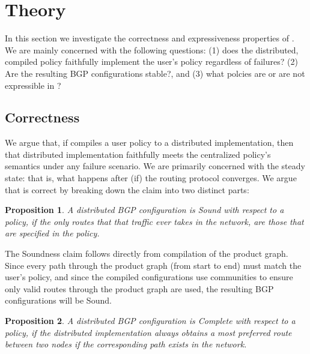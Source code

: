 \section{Theory}

\newtheorem{defn}{Proposition}[section]

In this section we investigate the correctness and expressiveness properties of \sysname. We are mainly concerned with the following questions: (1) does the distributed, compiled policy faithfully implement the user's policy regardless of failures? (2) Are the resulting BGP configurations stable?, and (3) what polcies are or are not expressible in \sysname?

\subsection{Correctness}

We argue that, if \sysname compiles a user policy to a distributed implementation, then that distributed implementation faithfully meets the centralized policy's semantics under any failure scenario. We are primarily concerned with the steady state: that is, what happens after (if) the routing protocol converges.  We argue that \sysname is correct by breaking down the claim into two distinct parts:


\begin{defn}
A distributed BGP configuration is \textit{Sound} with respect to a \sysname policy, if the only routes that that traffic ever takes in the network, are those that are specified in the policy.
\end{defn}

The Soundness claim follows directly from compilation of the product graph. Since every path through the product graph (from start to end) must match the user's policy, and since the compiled configurations use communities to ensure only valid routes through the product graph are used, the resulting BGP configurations will be Sound. 

\begin{defn}
A distributed BGP configuration is \textit{Complete} with respect to a \sysname policy, if the distributed implementation always obtains a most preferred route between two nodes if the corresponding path exists in the network.
\end{defn}

